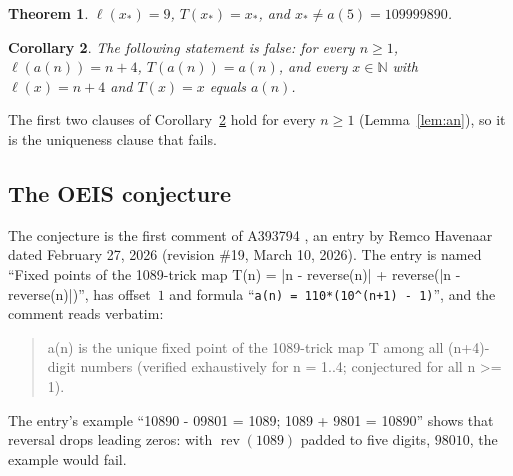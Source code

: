 \documentclass[11pt]{amsart}
\theoremstyle{plain}
\newtheorem{theorem}{Theorem}
\newtheorem{corollary}[theorem]{Corollary}
\theoremstyle{definition}
\newcommand{\N}{\mathbb{N}}
\DeclareMathOperator{\rev}{rev}
\newcommand{\len}{\ell}
\newcommand{\xs}{x_{\ast}}
\begin{document}
\begin{theorem}\label{thm:main}
$\len(\xs)=9$, $T(\xs)=\xs$, and $\xs\ne a(5)=109999890$.
\end{theorem}

\begin{corollary}\label{cor:main}
The following statement is false: for every $n\ge1$, $\len(a(n))=n+4$, $T(a(n))=a(n)$, and every $x\in\N$ with $\len(x)=n+4$ and $T(x)=x$ equals $a(n)$.
\end{corollary}

The first two clauses of Corollary~\ref{cor:main} hold for every $n\ge1$ (Lemma~\ref{lem:an}), so it is the uniqueness clause that fails.

\subsection{The OEIS conjecture}
The conjecture is the first comment of A393794 \cite{A393794}, an entry by Remco Havenaar dated February 27, 2026 (revision \#19, March 10, 2026). The entry is named ``Fixed points of the 1089-trick map T(n) = |n - reverse(n)| + reverse(|n - reverse(n)|)'', has offset~$1$ and formula ``\texttt{a(n) = 110*(10\^{}(n+1) - 1)}'', and the comment reads verbatim:
\begin{quote}\small
a(n) is the unique fixed point of the 1089-trick map T among all (n+4)-digit numbers (verified exhaustively for n = 1..4; conjectured for all n >= 1).
\end{quote}
The entry's example ``10890 - 09801 = 1089; 1089 + 9801 = 10890'' shows that reversal drops leading zeros: with $\rev(1089)$ padded to five digits, $98010$, the example would fail.
\end{document}
